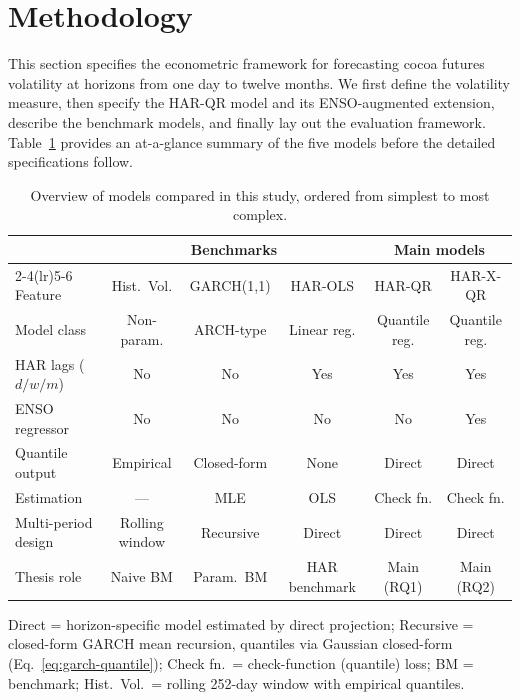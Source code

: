 \section{Methodology}
\label{sec:methodology}

This section specifies the econometric framework for forecasting cocoa futures
volatility at horizons from one day to twelve months. We first define the
volatility measure, then specify the HAR-QR model and its ENSO-augmented
extension, describe the benchmark models, and finally lay out the evaluation
framework. Table~\ref{tab:model-overview} provides an at-a-glance summary of
the five models before the detailed specifications follow.

\begin{table}[htbp]
\small
\caption{Overview of models compared in this study, ordered from simplest to
most complex.}
\label{tab:model-overview}
\noindent\hspace*{-1.25cm}\begin{tabular}{lccccc}
\toprule
 & \multicolumn{3}{c}{Benchmarks} & \multicolumn{2}{c}{Main models} \\
\cmidrule(lr){2-4}\cmidrule(lr){5-6}
Feature & Hist.\ Vol. & GARCH(1,1) & HAR-OLS & HAR-QR & HAR-X-QR \\
\midrule
Model class         & Non-param.     & ARCH-type    & Linear reg.    & Quantile reg.  & Quantile reg.  \\
HAR lags ($d/w/m$)  & No             & No           & Yes            & Yes            & Yes            \\
ENSO regressor      & No             & No           & No             & No             & Yes            \\
Quantile output     & Empirical      & Closed-form  & None           & Direct         & Direct         \\
Estimation          & ---            & MLE          & OLS            & Check fn.      & Check fn.      \\
Multi-period design & Rolling window & Recursive    & Direct         & Direct         & Direct         \\
Thesis role         & Naive BM       & Param.\ BM   & HAR benchmark  & Main (RQ1)     & Main (RQ2)     \\
\bottomrule
\end{tabular}
\par\smallskip
{\footnotesize Direct = horizon-specific model estimated by direct projection;
Recursive = closed-form GARCH mean recursion, quantiles via Gaussian closed-form
(Eq.~\ref{eq:garch-quantile}); Check fn.\ = check-function (quantile) loss;
BM = benchmark; Hist.\ Vol.\ = rolling 252-day window with empirical quantiles.}
\end{table}

